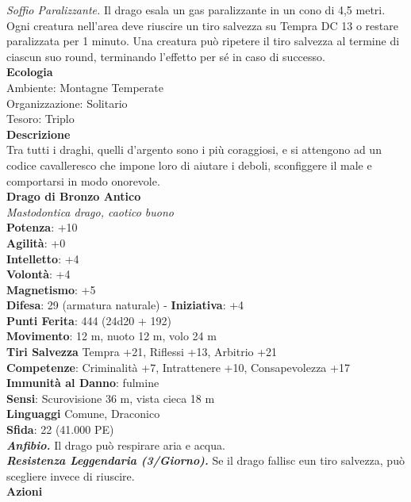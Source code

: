 \begin{multicols}{2}
\emph{Soffio Paralizzante.} Il drago esala un gas paralizzante in un cono di 4,5 metri. Ogni creatura nell'area deve riuscire un tiro salvezza su Tempra DC 13 o restare paralizzata per 1 minuto. Una creatura può ripetere il tiro salvezza al termine di ciascun suo round, terminando l'effetto per sé in caso di successo.\\
\textbf{Ecologia}\\
Ambiente: Montagne Temperate\\
Organizzazione: Solitario\\
Tesoro: Triplo\\
\textbf{Descrizione}\\
Tra tutti i draghi, quelli d’argento sono i più coraggiosi, e si attengono ad un codice cavalleresco che impone loro di aiutare i deboli, sconfiggere il male e comportarsi in modo onorevole.\\
\medskip\textbf{Drago di Bronzo Antico}\\
\emph{Mastodontica drago, caotico buono}\\
\textbf{Potenza}: +10\\
\textbf{Agilità}: +0\\
\textbf{Intelletto}: +4\\
\textbf{Volontà}: +4\\
\textbf{Magnetismo}: +5\\
\textbf{Difesa}: 29 (armatura naturale) - \textbf{Iniziativa}: +4\\
\textbf{Punti Ferita}: 444 (24d20 + 192)\\
\textbf{Movimento}: 12 m, nuoto 12 m, volo 24 m\\
\textbf{Tiri Salvezza} Tempra +21, Riflessi +13, Arbitrio +21\\
\textbf{Competenze}: Criminalità +7, Intrattenere +10, Consapevolezza +17\\
\textbf{Immunità al Danno}: fulmine\\
\textbf{Sensi}: Scurovisione 36 m, vista cieca 18 m\\
\textbf{Linguaggi} Comune, Draconico\\
\textbf{Sfida}: 22 (41.000 PE)\smallskip\\
\emph{\textbf{Anfibio.}} Il drago può respirare aria e acqua.\\
\emph{\textbf{Resistenza Leggendaria (3/Giorno).}} Se il drago fallisc eun tiro salvezza, può scegliere invece di riuscire. \\
\smallskip\textbf{Azioni}\\

\end{multicols}
